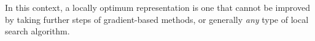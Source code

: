 \documentclass{article}
\theoremstyle{definition}  %
\theoremstyle{plain}
\numberwithin{observation}{section}
\numberwithin{claim}{section}
\numberwithin{fact}{section}
\numberwithin{lemma}{section}
\numberwithin{proposition}{section}
\numberwithin{theorem}{section}
\numberwithin{corollary}{section}
\numberwithin{definition}{section}
\newcommand{\lnorm}{\left\lVert}
\newcommand{\rnorm}{\right\rVert}
\DeclareMathOperator{\dist}{dist}
\newcommand{\x}{x}
\newcommand{\y}{y}
\newcommand{\z}{z}
\newcommand{\anc}{\x}
\newcommand{\pos}{\y}
\renewcommand{\neg}{\z}
\theoremstyle{plain}
\begin{document}
In this context, a locally optimum representation is one that cannot be improved by taking further steps of gradient-based methods, or generally \textit{any} type of local search algorithm.














\end{document}
